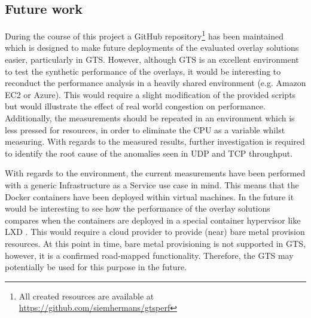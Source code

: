 \subsection{Future work}
During the course of this project a GitHub repository\footnote{All created resources are available at \url{https://github.com/siemhermans/gtsperf}} has been maintained which is designed to make future deployments of the evaluated overlay solutions easier, particularly in GTS. However, although GTS is an excellent environment to test the synthetic performance of the overlays, it would be interesting to reconduct the performance analysis in a heavily shared environment (e.g. Amazon EC2 or Azure). This would require a slight modification of the provided scripts but would illustrate the effect of real world congestion on performance. Additionally, the measurements should be repeated in an environment which is less pressed for resources, in order to eliminate the CPU as a variable whilst measuring. With regards to the measured results, further investigation is required to identify the root cause of the anomalies seen in UDP and TCP throughput.  

With regards to the environment, the current measurements have been performed with a generic Infrastructure as a Service use case in mind. This means that the Docker containers have been deployed within virtual machines. In the future it would be interesting to see how the performance of the overlay solutions compares when the containers are deployed in a special container hypervisor like LXD \cite{ubuntulxd}. This would require a cloud provider to provide (near) bare metal provision resources. At this point in time, bare metal provisioning is not supported in GTS, however, it is a confirmed road-mapped functionality. Therefore, the GTS may potentially be used for this purpose in the future.
